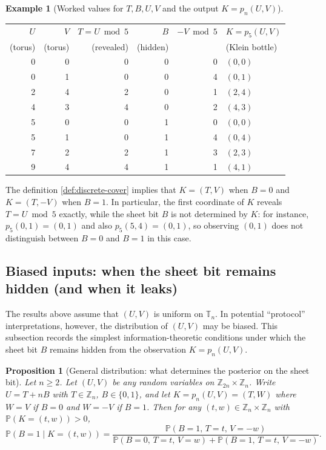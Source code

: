\documentclass[11pt,a4paper]{article}
\newtheorem{proposition}[theorem]{Proposition}
\theoremstyle{definition}
\newtheorem{example}[theorem]{Example}
\theoremstyle{remark}
\begin{document}
\begin{example}[Worked values for \(T,B,U,V\) and the output \(K=p_n(U,V)\)]
\begin{center}
\begin{tabular}{r r r r r l}
\hline
\(U\) & \(V\) & \(T=U\bmod 5\) & \(B\) & \(-V \bmod 5\) & \(K=p_5(U,V)\) \\
 \footnotesize (torus) & \footnotesize (torus) & \footnotesize (revealed) & \footnotesize (hidden) & & \footnotesize (Klein bottle) \\
\hline
0 & 0 & 0 & 0 & 0 & \((0,0)\) \\
0 & 1 & 0 & 0 & 4 & \((0,1)\) \\
2 & 4 & 2 & 0 & 1 & \((2,4)\) \\
4 & 3 & 4 & 0 & 2 & \((4,3)\) \\
5 & 0 & 0 & 1 & 0 & \((0,0)\) \\
5 & 1 & 0 & 1 & 4 & \((0,4)\) \\
7 & 2 & 2 & 1 & 3 & \((2,3)\) \\
9 & 4 & 4 & 1 & 1 & \((4,1)\) \\
\hline
\end{tabular}
\end{center}

The definition \cref{def:discrete-cover} implies that \(K=(T,V)\) when \(B=0\) and \(K=(T,-V)\) when \(B=1\). In particular, the first coordinate of \(K\) reveals \(T=U\bmod 5\) exactly, while the sheet bit \(B\) is not determined by \(K\): for instance, \(p_5(0,1)=(0,1)\) and also \(p_5(5,4)=(0,1)\), so observing \((0,1)\) does not distinguish between \(B=0\) and \(B=1\) in this case.
\end{example}

\subsection{Biased inputs: when the sheet bit remains hidden (and when it leaks)}
\label{sec:biased-u}

The results above assume that \((U,V)\) is uniform on \(\mathbb{T}_n\). In potential ``protocol'' interpretations, however, the distribution of \((U,V)\) may be biased. This subsection records the simplest information-theoretic conditions under which the sheet bit \(B\) remains hidden from the observation \(K=p_n(U,V)\).

\begin{proposition}[General distribution: what determines the posterior on the sheet bit]
\label{prop:posterior-b-general}
Let \(n\ge 2\). Let \((U,V)\) be \emph{any} random variables on \(\mathbb{Z}_{2n}\times \mathbb{Z}_n\). Write \(U=T+nB\) with \(T\in\mathbb{Z}_n\), \(B\in\{0,1\}\), and let \(K=p_n(U,V)=(T,W)\) where \(W=V\) if \(B=0\) and \(W=-V\) if \(B=1\). Then for any \((t,w)\in \mathbb{Z}_n\times\mathbb{Z}_n\) with \(\mathbb{P}(K=(t,w))>0\),
\[
\mathbb{P}(B=1\mid K=(t,w))
=
\frac{\mathbb{P}(B=1,\,T=t,\,V=-w)}{\mathbb{P}(B=0,\,T=t,\,V=w)+\mathbb{P}(B=1,\,T=t,\,V=-w)}.
\]
\end{proposition}
\end{document}
